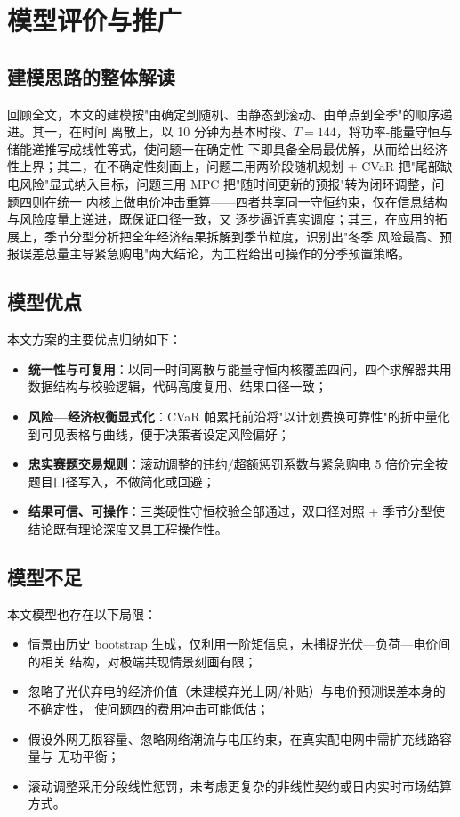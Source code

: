 \documentclass[withoutpreface]{cumcmthesis}
\begin{document}
\section{模型评价与推广}
\subsection{建模思路的整体解读}
回顾全文，本文的建模按"由确定到随机、由静态到滚动、由单点到全季"的顺序递进。其一，在时间
离散上，以 10 分钟为基本时段、$T=144$，将功率-能量守恒与储能递推写成线性等式，使问题一在确定性
下即具备全局最优解，从而给出经济性上界；其二，在不确定性刻画上，问题二用两阶段随机规划 + CVaR
把"尾部缺电风险"显式纳入目标，问题三用 MPC 把"随时间更新的预报"转为闭环调整，问题四则在统一
内核上做电价冲击重算——四者共享同一守恒约束，仅在信息结构与风险度量上递进，既保证口径一致，又
逐步逼近真实调度；其三，在应用的拓展上，季节分型分析把全年经济结果拆解到季节粒度，识别出"冬季
风险最高、预报误差总量主导紧急购电"两大结论，为工程给出可操作的分季预置策略。

\subsection{模型优点}
本文方案的主要优点归纳如下：
\begin{itemize}
    \item \textbf{统一性与可复用}：以同一时间离散与能量守恒内核覆盖四问，四个求解器共用
          数据结构与校验逻辑，代码高度复用、结果口径一致；
    \item \textbf{风险—经济权衡显式化}：CVaR 帕累托前沿将"以计划费换可靠性"的折中量化
          到可见表格与曲线，便于决策者设定风险偏好；
    \item \textbf{忠实赛题交易规则}：滚动调整的违约/超额惩罚系数与紧急购电 5 倍价完全按
          题目口径写入，不做简化或回避；
    \item \textbf{结果可信、可操作}：三类硬性守恒校验全部通过，双口径对照 + 季节分型使
          结论既有理论深度又具工程操作性。
\end{itemize}

\subsection{模型不足}
本文模型也存在以下局限：
\begin{itemize}
    \item 情景由历史 bootstrap 生成，仅利用一阶矩信息，未捕捉光伏—负荷—电价间的相关
          结构，对极端共现情景刻画有限；
    \item 忽略了光伏弃电的经济价值（未建模弃光上网/补贴）与电价预测误差本身的不确定性，
          使问题四的费用冲击可能低估；
    \item 假设外网无限容量、忽略网络潮流与电压约束，在真实配电网中需扩充线路容量与
          无功平衡；
    \item 滚动调整采用分段线性惩罚，未考虑更复杂的非线性契约或日内实时市场结算方式。
\end{itemize}
\end{document}
